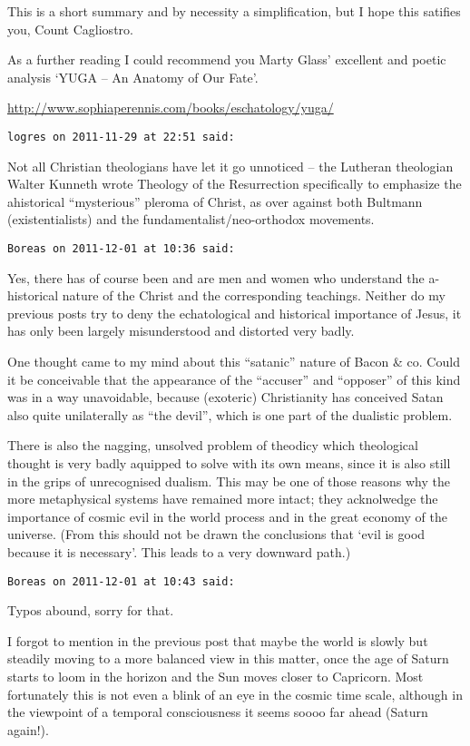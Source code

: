 \begin{footnotesize}
\begin{sffamily}
This is a short summary and by necessity a simplification, but I hope this satifies you, Count Cagliostro.

As a further reading I could recommend you Marty Glass' excellent and poetic analysis `YUGA – An Anatomy of Our Fate'.

\url{http://www.sophiaperennis.com/books/eschatology/yuga/}


\hfill

\texttt{logres on 2011-11-29 at 22:51 said: }

Not all Christian theologians have let it go unnoticed – the Lutheran theologian Walter Kunneth wrote Theology of the Resurrection specifically to emphasize the ahistorical “mysterious” pleroma of Christ, as over against both Bultmann (existentialists) and the fundamentalist/neo-orthodox movements.


\hfill

\texttt{Boreas on 2011-12-01 at 10:36 said: }

Yes, there has of course been and are men and women who understand the a-historical nature of the Christ and the corresponding teachings. Neither do my previous posts try to deny the echatological and historical importance of Jesus, it has only been largely misunderstood and distorted very badly.

One thought came to my mind about this “satanic” nature of Bacon \& co. Could it be conceivable that the appearance of the “accuser” and “opposer” of this kind was in a way unavoidable, because (exoteric) Christianity has conceived Satan also quite unilaterally as “the devil”, which is one part of the dualistic problem.

There is also the nagging, unsolved problem of theodicy which theological thought is very badly aquipped to solve with its own means, since it is also still in the grips of unrecognised dualism. This may be one of those reasons why the more metaphysical systems have remained more intact; they acknolwedge the importance of cosmic evil in the world process and in the great economy of the universe. (From this should not be drawn the conclusions that `evil is good because it is necessary'. This leads to a very downward path.)


\hfill

\texttt{Boreas on 2011-12-01 at 10:43 said: }

Typos abound, sorry for that.

I forgot to mention in the previous post that maybe the world is slowly but steadily moving to a more balanced view in this matter, once the age of Saturn starts to loom in the horizon and the Sun moves closer to Capricorn. Most fortunately this is not even a blink of an eye in the cosmic time scale, although in the viewpoint of a temporal consciousness it seems soooo far ahead (Saturn again!).



\end{sffamily}
\end{footnotesize}
